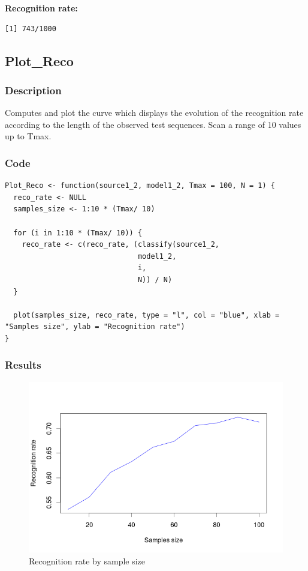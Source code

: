 \documentclass[a4paper]{article}
\begin{document}
\textbf{Recognition rate:}

\begin{lstlisting}
[1] 743/1000
\end{lstlisting}

\subsection{Plot\_Reco}

\subsubsection{Description}
Computes and plot the curve which displays the evolution of the recognition rate according to the length of the observed test sequences. Scan a range of 10 values up to Tmax.
\subsubsection{Code}

\begin{lstlisting}
Plot_Reco <- function(source1_2, model1_2, Tmax = 100, N = 1) {
  reco_rate <- NULL
  samples_size <- 1:10 * (Tmax/ 10)
  
  for (i in 1:10 * (Tmax/ 10)) {
    reco_rate <- c(reco_rate, (classify(source1_2,
                               model1_2,
                               i,
                               N)) / N)
  }
  
  plot(samples_size, reco_rate, type = "l", col = "blue", xlab = "Samples size", ylab = "Recognition rate")
}
\end{lstlisting}

\subsubsection{Results}

\begin{figure}[ht!]
\centering
\includegraphics[width=120mm]{recograph.png}
\caption{Recognition rate by sample size}
\label{overflow}
\end{figure}
\end{document}
